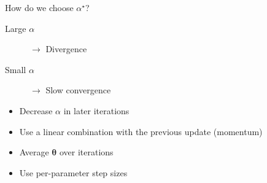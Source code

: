 \documentclass[12pt,aspectratio=169]{beamer}
\renewcommand{\vec}[1]{\ensuremath{\mathbf{#1}}}
\begin{document}
\begin{frame}{How do we choose $\alpha^{\star}$?}
    \begin{description}
        \item[Large $\alpha$] $\to$ Divergence
        \item[Small $\alpha$] $\to$ Slow convergence
    \end{description}
    \vfill
    \begin{itemize}
        \item Decrease $\alpha$ in later iterations
        \item Use a linear combination with the previous update (\alert{momentum})
        \item Average $\vec{\theta}$ over iterations
        \item Use per\hyp{}parameter step sizes
    \end{itemize}
\end{frame}
\end{document}
